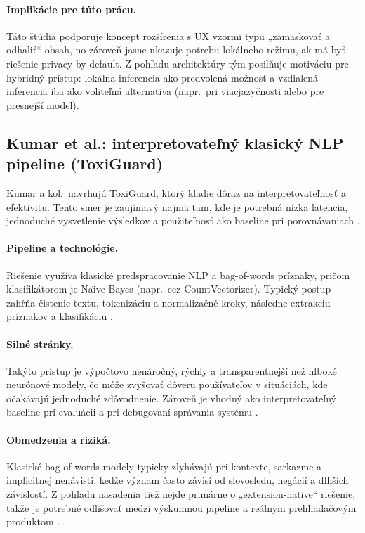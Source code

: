 \paragraph{Implikácie pre túto prácu.}
Táto štúdia podporuje koncept rozšírenia s UX vzormi typu „zamaskovať a odhaliť“ obsah, no zároveň jasne ukazuje potrebu lokálneho režimu, ak má byť riešenie privacy-by-default. Z pohľadu architektúry tým posilňuje motiváciu pre hybridný prístup: lokálna inferencia ako predvolená možnosť a vzdialená inferencia iba ako voliteľná alternatíva (napr.\ pri viacjazyčnosti alebo pre presnejší model).

\subsection{Kumar et al.: interpretovateľný klasický NLP pipeline (ToxiGuard)}\label{subsec:kumar_related}
Kumar a kol.\ navrhujú ToxiGuard, ktorý kladie dôraz na interpretovateľnosť a efektivitu. Tento smer je zaujímavý najmä tam, kde je potrebná nízka latencia, jednoduché vysvetlenie výsledkov a použiteľnosť ako baseline pri porovnávaniach \cite{kumar2024eliminating}.

\paragraph{Pipeline a technológie.}
Riešenie využíva klasické predspracovanie NLP a bag-of-words príznaky, pričom klasifikátorom je Na\"{\i}ve Bayes (napr.\ cez CountVectorizer). Typický postup zahŕňa čistenie textu, tokenizáciu a normalizačné kroky, následne extrakciu príznakov a klasifikáciu \cite{kumar2024eliminating}.

\paragraph{Silné stránky.}
Takýto prístup je výpočtovo nenáročný, rýchly a transparentnejší než hlboké neurónové modely, čo môže zvyšovať dôveru používateľov v situáciách, kde očakávajú jednoduché zdôvodnenie. Zároveň je vhodný ako interpretovateľný baseline pri evaluácii a pri debugovaní správania systému \cite{kumar2024eliminating}.

\paragraph{Obmedzenia a riziká.}
Klasické bag-of-words modely typicky zlyhávajú pri kontexte, sarkazme a implicitnej nenávisti, keďže význam často závisí od slovosledu, negácií a dlhších závislostí. Z pohľadu nasadenia tiež nejde primárne o „extension-native“ riešenie, takže je potrebné odlišovať medzi výskumnou pipeline a reálnym prehliadačovým produktom \cite{kumar2024eliminating}.

